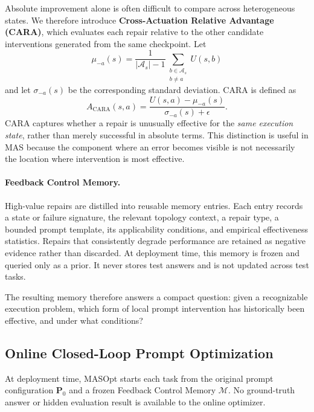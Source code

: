 Absolute improvement alone is often difficult to compare across heterogeneous states.
We therefore introduce \textbf{Cross-Actuation Relative Advantage (CARA)}, which evaluates each repair relative to the other candidate interventions generated from the same checkpoint.
Let
\begin{equation}
    \mu_{-a}(s)
    =
    \frac{1}{|\mathcal{A}_s|-1}
    \sum_{\substack{b\in\mathcal{A}_s\\b\neq a}}
    U(s,b)
\end{equation}
and let $\sigma_{-a}(s)$ be the corresponding standard deviation.
CARA is defined as
\begin{equation}
    A_{\mathrm{CARA}}(s,a)
    =
    \frac{
        U(s,a)-\mu_{-a}(s)
    }{
        \sigma_{-a}(s)+\epsilon
    }.
    \label{eq:cara}
\end{equation}
CARA captures whether a repair is unusually effective for the \emph{same execution state}, rather than merely successful in absolute terms.
This distinction is useful in MAS because the component where an error becomes visible is not necessarily the location where intervention is most effective.

\paragraph{\textbf{Feedback Control Memory.}}
High-value repairs are distilled into reusable memory entries.
Each entry records a state or failure signature, the relevant topology context, a repair type, a bounded prompt template, its applicability conditions, and empirical effectiveness statistics.
Repairs that consistently degrade performance are retained as negative evidence rather than discarded.
At deployment time, this memory is frozen and queried only as a prior.
It never stores test answers and is not updated across test tasks.

The resulting memory therefore answers a compact question: given a recognizable execution problem, which form of local prompt intervention has historically been effective, and under what conditions?


\subsection{Online Closed-Loop Prompt Optimization}
\label{sec:online}

At deployment time, MASOpt starts each task from the original prompt configuration $\mathbf{P}_0$ and a frozen Feedback Control Memory $\mathcal{M}$.
No ground-truth answer or hidden evaluation result is available to the online optimizer.

